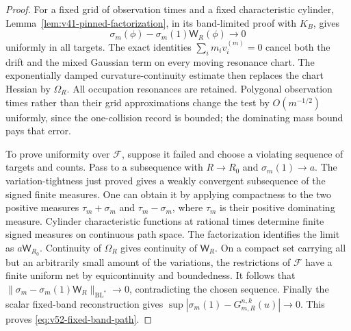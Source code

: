 \begin{proof}
For a fixed grid of observation times and a fixed characteristic
cylinder, Lemma~\ref{lem:v41-pinned-factorization}, in its
band-limited proof with $K_B$, gives
\[
 \sigma_m(\phi)-\sigma_m(1)\mathsf W_R(\phi)\longrightarrow0
\]
uniformly in all targets. The exact identities
$\sum_i m_iv_i^{(m)}=0$ cancel both the drift and the mixed Gaussian
term on every moving resonance chart. The exponentially damped
curvature-continuity estimate then replaces the chart Hessian by
$\Omega_R$. All occupation resonances are retained.
Polygonal observation times rather than their grid approximations
change the test by $O(m^{-1/2})$ uniformly, since the one-collision
record is bounded; the dominating mass bound pays that error.

To prove uniformity over $\mathcal F$, suppose it failed and choose
a violating sequence of targets and counts. Pass to a subsequence
with $R\to R_0$ and $\sigma_m(1)\to a$. The variation-tightness
just proved gives a weakly convergent subsequence of the signed
finite measures. One can obtain it by applying compactness to the
two positive measures $\tau_m+\sigma_m$ and $\tau_m-\sigma_m$,
where $\tau_m$ is their positive dominating measure.
Cylinder characteristic functions at rational times determine finite
signed measures on continuous path space. The factorization identifies
the limit as $a\mathsf W_{R_0}$. Continuity of $\Omega_R$ gives
continuity of $\mathsf W_R$. On a compact set carrying all but an
arbitrarily small amount of the variations, the restrictions of
$\mathcal F$ have a finite uniform net by equicontinuity and boundedness.
It follows that
$\|\sigma_m-\sigma_m(1)\mathsf W_R\|_{\mathrm{BL}^*}\to0$,
contradicting the chosen sequence. Finally the scalar fixed-band
reconstruction gives
$\sup|\sigma_m(1)-G_{m,R}^{n,k}(u)|\to0$. This proves
\eqref{eq:v52-fixed-band-path}.
\end{proof}

